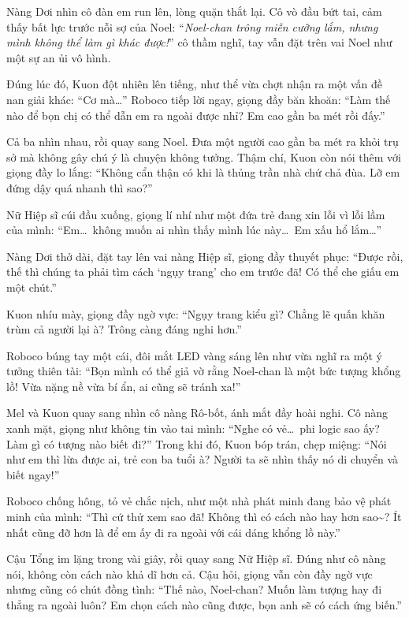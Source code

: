 \documentclass[../main.tex]{subfiles}
\begin{document}
Nàng Dơi nhìn cô đàn em run lên, lòng quặn thắt lại. Cô vò đầu bứt tai, cảm thấy bất lực trước nỗi sợ của Noel: ``\textit{Noel-chan trông miễn cưỡng lắm, nhưng mình không thể làm gì khác được!}'' cô thầm nghĩ, tay vẫn đặt trên vai Noel như một sự an ủi vô hình.


Đúng lúc đó, Kuon đột nhiên lên tiếng, như thể vừa chợt nhận ra một vấn đề nan giải khác: ``Cơ mà\dots'' Roboco tiếp lời ngay, giọng đầy băn khoăn: ``Làm thế nào để bọn chị có thể dẫn em ra ngoài được nhỉ? Em cao gần ba mét rồi đấy.''

Cả ba nhìn nhau, rồi quay sang Noel. Đưa một người cao gần ba mét ra khỏi trụ sở mà không gây chú ý là chuyện không tưởng. Thậm chí, Kuon còn nói thêm với giọng đầy lo lắng: ``Không cẩn thận có khi là thủng trần nhà chứ chả đùa. Lỡ em đứng dậy quá nhanh thì sao?''

Nữ Hiệp sĩ cúi đầu xuống, giọng lí nhí như một đứa trẻ đang xin lỗi vì lỗi lầm của mình: ``Em\dots\ không muốn ai nhìn thấy mình lúc này\dots\ Em xấu hổ lắm\dots''

Nàng Dơi thở dài, đặt tay lên vai nàng Hiệp sĩ, giọng đầy thuyết phục: ``Được rồi, thế thì chúng ta phải tìm cách `ngụy trang' cho em trước đã! Có thể che giấu em một chút.''

Kuon nhíu mày, giọng đầy ngờ vực: ``Ngụy trang kiểu gì? Chẳng lẽ quấn khăn trùm cả người lại à? Trông càng đáng nghi hơn.''

Roboco búng tay một cái, đôi mắt LED vàng sáng lên như vừa nghĩ ra một ý tưởng thiên tài: ``Bọn mình có thể giả vờ rằng Noel-chan là một bức tượng khổng lồ! Vừa nặng nề vừa bí ẩn, ai cũng sẽ tránh xa!''

Mel và Kuon quay sang nhìn cô nàng Rô-bốt, ánh mắt đầy hoài nghi. Cô nàng xanh mặt, giọng như không tin vào tai mình: ``Nghe có vẻ\dots\ phi logic sao ấy? Làm gì có tượng nào biết đi?'' Trong khi đó, Kuon bóp trán, chẹp miệng: ``Nói như em thì lừa được ai, trẻ con ba tuổi à? Người ta sẽ nhìn thấy nó di chuyển và biết ngay!''

Roboco chống hông, tỏ vẻ chắc nịch, như một nhà phát minh đang bảo vệ phát minh của mình: ``Thì cứ thử xem sao đã! Không thì có cách nào hay hơn sao\~{}? Ít nhất cũng đỡ hơn là để em ấy đi ra ngoài với cái dáng khổng lồ này.''

Cậu Tổng im lặng trong vài giây, rồi quay sang Nữ Hiệp sĩ. Đúng như cô nàng nói, không còn cách nào khả dĩ hơn cả. Cậu hỏi, giọng vẫn còn đầy ngờ vực nhưng cũng có chút đồng tình: ``Thế nào, Noel-chan? Muốn làm tượng hay đi thẳng ra ngoài luôn? Em chọn cách nào cũng được, bọn anh sẽ có cách ứng biến.''
\end{document}

